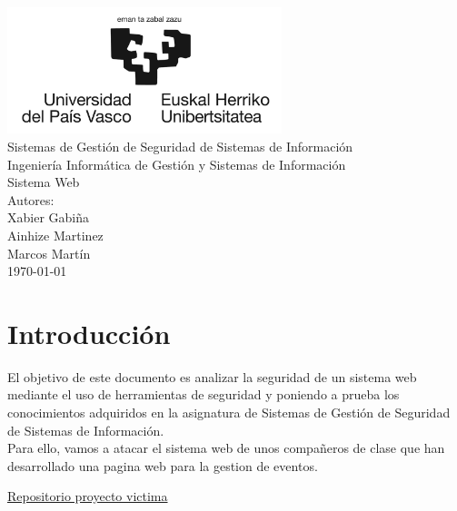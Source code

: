 \documentclass{report}
\begin{document}
    \begin{titlepage}
        \centering
        \includegraphics[width=0.6\textwidth]{./img/miscelanio/logo.jpg}\\
        \vspace{1cm}
        \LARGE Sistemas de Gestión de Seguridad de Sistemas de Información\\
        \vspace{0.5cm}
        \Large Ingeniería Informática de Gestión y Sistemas de Información\\
        \vspace{3cm}
        \Huge Sistema Web\\
        \vspace{2.5cm}
        \Large Autores:\\
        \vspace{0.2cm}
        \large Xabier Gabiña\\
        \large Ainhize Martinez\\
        \large Marcos Martín\\
        \vfill
        \today
    \end{titlepage}
    \tableofcontents
    \chapter{Introducción}
        El objetivo de este documento es analizar la seguridad de un sistema web mediante el uso de herramientas de seguridad y poniendo a prueba los conocimientos adquiridos en la asignatura de Sistemas de Gestión de Seguridad de Sistemas de Información.\\

        Para ello, vamos a atacar el sistema web de unos compañeros de clase que han desarrollado una pagina web para la gestion de eventos.\\
        \begin{center}
            \href{https://github.com/ImanolMM/Eventify}{Repositorio proyecto victima}
        \end{center}
        
\end{document}
